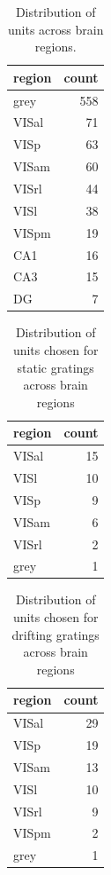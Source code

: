 \documentclass[10pt,twocolumn]{article}
\begin{document}
\begin{table}[H]
\centering
\begin{tabular}{lr}
\toprule
region & count \\
\midrule
grey   & 558 \\
VISal  &  71 \\
VISp   &  63 \\
VISam  &  60 \\
VISrl  &  44 \\
VISl   &  38 \\
VISpm  &  19 \\
CA1    &  16 \\
CA3    &  15 \\
DG     &   7 \\
\bottomrule
\end{tabular}
\caption{Distribution of units across brain regions.}
\label{tab:regions}
\end{table}

\begin{table}[h]
\centering
\begin{tabular}{lr}
\toprule
region & count \\
\midrule
VISal  & 15 \\
VISl   & 10 \\
VISp   &  9 \\
VISam  &  6 \\
VISrl  &  2 \\
grey   &  1 \\
\bottomrule
\end{tabular}
\caption{Distribution of units chosen for static gratings across brain regions}
\label{tab:chosen-regions-static}
\end{table}

\begin{table}[h]
\centering
\begin{tabular}{lr}
\toprule
region & count \\
\midrule
VISal  & 29 \\
VISp   & 19 \\
VISam  & 13 \\
VISl   & 10 \\
VISrl  &  9 \\
VISpm  &  2 \\
grey   &  1 \\
\bottomrule
\end{tabular}
\caption{Distribution of units chosen for drifting gratings across brain regions}
\label{tab:chosen-regions-drifting}
\end{table}
\end{document}
